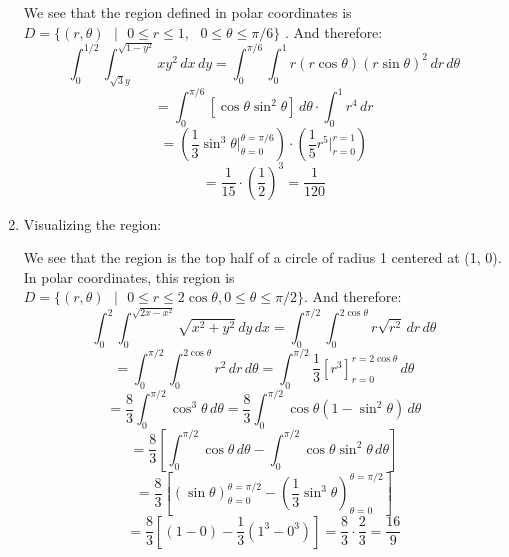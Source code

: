\begin{Answer}[ref = polarmulti3]
\begin{enumerate}
    We see that the region defined in polar coordinates is $\textit{D} = \{(r, 
    \theta)\text{ }|\text{ }0 \leq r \leq 1,\text{ }0 \leq \theta \leq \pi/6\}$
    . And therefore:
    $$\int_0^{1/2} \int_{\sqrt{3}y}^{\sqrt{1 - y^2}} xy^2\,dx\,dy = \int_0^{
    \pi/6} \int_0^1 r \left( r \cos{\theta} \right) \left(r \sin{\theta} 
    \right)^2\,dr\,d\theta$$
    $$= \int_0^{\pi/6} \left[ \cos{\theta} \sin^2{\theta} \right]\,d\theta 
    \cdot \int_0^1 r^4 \,dr$$
    $$= \left( \frac{1}{3}\sin^3{\theta}|_{\theta = 0}^{\theta = \pi/6} \right) 
    \cdot \left( \frac{1}{5} r^5 |_{r = 0}^{r = 1}\right)$$
    $$= \frac{1}{15} \cdot \left( \frac{1}{2} \right)^3 = \frac{1}{120}$$

    \item Visualizing the region:
    

    We see that the region is the top half of a circle of radius 1 centered at 
    (1, 0). In polar coordinates, this region is $\textit{D} = \{(r, \theta)
    \text{ }|\text{ }0 \leq r \leq 2\cos{\theta}, 0 \leq \theta \leq \pi/2\}$. 
    And therefore:
    $$\int_0^2 \int_0^{\sqrt{2x - x^2}} \sqrt{x^2 + y^2}\,dy\,dx = \int_0^{\pi/
    2} \int_0^{2\cos{\theta}} r \sqrt{r^2}\,dr\,d\theta$$
    $$= \int_0^{\pi/2} \int_{0}^{2\cos{\theta}} r^2\,dr\,d\theta = \int_0^{\pi/
    2} \frac{1}{3} \left[ r^3 \right]_{r = 0}^{r = 2\cos{\theta}}\,d\theta$$
    $$= \frac{8}{3} \int_0^{\pi/2} \cos^3{\theta}\,d\theta = \frac{8}{3} \int_
    0^{\pi/2} \cos{\theta} \left(1 - \sin^2{\theta} \right)\,d\theta$$
    $$= \frac{8}{3} \left[ \int_0^{\pi/2} \cos{\theta}\,d\theta - \int_0^{\pi/2
    } \cos{\theta}\sin^2{\theta}\,d\theta \right]$$
    $$= \frac{8}{3} \left[ \left(\sin{\theta} \right)_{\theta = 0}^{\theta = 
    \pi/2} - \left( \frac{1}{3} \sin^3{\theta} \right)_{\theta = 0}^{\theta = 
    \pi/2} \right]$$
    $$= \frac{8}{3} \left[ \left(1 - 0 \right) - \frac{1}{3} \left( 1^3 - 0^3 
    \right) \right] = \frac{8}{3} \cdot \frac{2}{3} = \frac{16}{9}$$
\end{enumerate}
\end{Answer}

